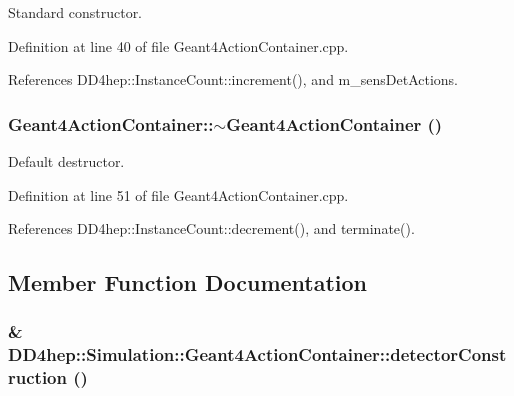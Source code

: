 Standard constructor. 

Definition at line 40 of file Geant4ActionContainer.cpp.

References DD4hep::InstanceCount::increment(), and m\_\-sensDetActions.\hypertarget{class_d_d4hep_1_1_simulation_1_1_geant4_action_container_ab80f72eb6020b84e6ad03adfe9d7f61e}{
\subsubsection[{$\sim$Geant4ActionContainer}]{\setlength{\rightskip}{0pt plus 5cm}Geant4ActionContainer::$\sim$Geant4ActionContainer ()}}
\label{class_d_d4hep_1_1_simulation_1_1_geant4_action_container_ab80f72eb6020b84e6ad03adfe9d7f61e}


Default destructor. 

Definition at line 51 of file Geant4ActionContainer.cpp.

References DD4hep::InstanceCount::decrement(), and terminate().

\subsection{Member Function Documentation}
\hypertarget{class_d_d4hep_1_1_simulation_1_1_geant4_action_container_a21020ac85efccf58c0b292d25a954a15}{
\subsubsection[{detectorConstruction}]{\& DD4hep::Simulation::Geant4ActionContainer::detectorConstruction ()}}
\label{class_d_d4hep_1_1_simulation_1_1_geant4_action_container_a21020ac85efccf58c0b292d25a954a15}



